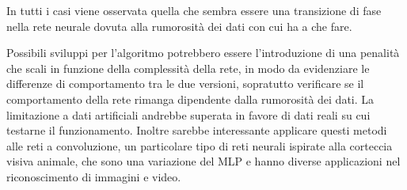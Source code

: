 \documentclass[12pt,a4paper]{report}
\begin{document}
In tutti i casi viene osservata quella che sembra essere una transizione di fase nella rete neurale dovuta alla rumorosità dei dati con cui ha a che fare.

Possibili sviluppi per l'algoritmo potrebbero essere l'introduzione di una penalità che scali in funzione della complessità della rete, in modo da evidenziare le differenze di comportamento tra le due versioni, sopratutto verificare se il comportamento della rete rimanga dipendente dalla rumorosità dei dati.
La limitazione a dati artificiali andrebbe superata in favore di dati reali su cui testarne il funzionamento.
Inoltre sarebbe interessante applicare questi metodi alle reti a convoluzione, un particolare tipo di reti neurali ispirate alla corteccia visiva animale, che sono una variazione del MLP e hanno diverse applicazioni nel riconoscimento di immagini e video.

\listoffigures

\nocite{*}


\end{document}
